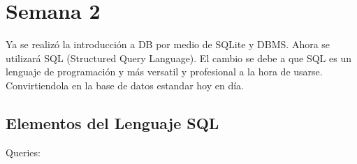 \section{Semana 2}

Ya se realizó la introducción a DB por medio de SQLite y DBMS. Ahora se utilizará SQL (Structured Query Language). El cambio se debe a que SQL es un lenguaje de programación y más versatil y profesional a la hora de usarse. Convirtiendola en la base de datos estandar hoy en día.

\subsection{Elementos del Lenguaje SQL}

\begin{description}
	\item[Queries: ] 
\end{description}




























